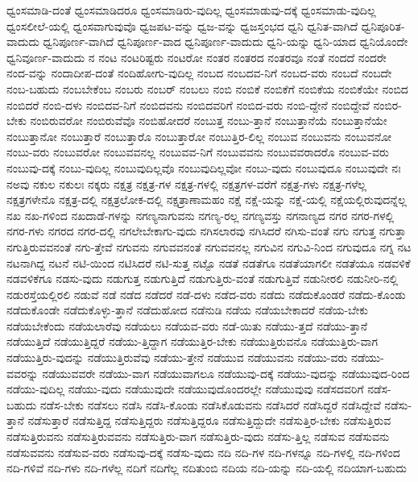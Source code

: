 {ಧ್ವಂಸಮಾಡಿ-ದಂತೆ
ಧ್ವಂಸಮಾಡಿದರೂ
ಧ್ವಂಸಮಾಡಿರು-ವುದಿಲ್ಲ
ಧ್ವಂಸಮಾಡುವು-ದಕ್ಕೆ
ಧ್ವಂಸಮಾಡು-ವುದಿಲ್ಲ
ಧ್ವಂಸಲೀಲೆ-ಯಲ್ಲಿ
ಧ್ವಂಸವಾಗುವುವೊ
ಧ್ವಜಪಟ-ವನ್ನು
ಧ್ವಜ-ವನ್ನು
ಧ್ವಜಸ್ತಂಭದ
ಧ್ವನಿ
ಧ್ವನಿತ-ವಾಗಿದೆ
ಧ್ವನಿಪೂರಿತ-ವಾದುದು
ಧ್ವನಿಪೂರ್ಣ-ವಾಗಿದೆ
ಧ್ವನಿಪೂರ್ಣ-ವಾದ
ಧ್ವನಿಪೂರ್ಣ-ವಾದುದು
ಧ್ವನಿ-ಯನ್ನು
ಧ್ವನಿ-ಯಾದ
ಧ್ವನಿಯೊಂದೇ
ಧ್ವನಿವೂರ್ಣ-ವಾದುದು
ನ
ನಂಟ
ನಂಟರಿಷ್ಟರು
ನಂಟರೋ
ನಂತರ
ನಂತರದ
ನಂತರವೂ
ನಂತೆ
ನಂದದೆ
ನಂದರೇ
ನಂದ-ವನ್ನು
ನಂದಾದೀಪ-ದಂತೆ
ನಂದಿಹೋಗು-ವುದಿಲ್ಲ
ನಂಬದ
ನಂಬದವ-ನಿಗೆ
ನಂಬದ-ವರು
ನಂಬದೆ
ನಂಬದೇ
ನಂಬ-ಬಹುದು
ನಂಬಬೇಕೆಂಬ
ನಂಬರು
ನಂಬರ್
ನಂಬಲು
ನಂಬಿ
ನಂಬಿಕೆ
ನಂಬಿಕೆಗೆ
ನಂಬಿಕೆಯ
ನಂಬಿಕೆಯೇ
ನಂಬಿದ
ನಂಬಿದರೆ
ನಂಬಿ-ದಳು
ನಂಬಿದವ-ನಿಗೆ
ನಂಬಿದವನು
ನಂಬಿದವರಿಗೆ
ನಂಬಿದ-ವರು
ನಂಬಿ-ದ್ದೇನೆ
ನಂಬಿದ್ದೇವೆ
ನಂಬಿರ-ಬೇಕು
ನಂಬಿರುವರೋ
ನಂಬಿರುವೆವೊ
ನಂಬಿಹೋದರೆ
ನಂಬುತ್ತ
ನಂಬು-ತ್ತಾನೆ
ನಂಬುತ್ತಾನೆಯೆ
ನಂಬುತ್ತಾನೆಯೇ
ನಂಬುತ್ತಾನೋ
ನಂಬುತ್ತಾರೆ
ನಂಬುತ್ತಾರೊ
ನಂಬುತ್ತಾರೋ
ನಂಬುತ್ತಿರ-ಲಿಲ್ಲ
ನಂಬುವ
ನಂಬುವನು
ನಂಬುವನೋ
ನಂಬು-ವರು
ನಂಬುವರೋ
ನಂಬುವವನಲ್ಲ
ನಂಬುವವ-ನಿಗೆ
ನಂಬುವವನು
ನಂಬುವವರಾದರೊ
ನಂಬುವ-ವರು
ನಂಬುವು-ದಕ್ಕೆ
ನಂಬು-ವುದಿಲ್ಲ
ನಂಬುವುದಿಲ್ಲವೊ
ನಂಬುವುದಿಲ್ಲವೋ
ನಂಬು-ವುದು
ನಂಬುವುದೂ
ನಂಬುವುದೇ
ನಃ
ನಅವು
ನಕುಲ
ನಕುಲಃ
ನಕ್ಕರು
ನಕ್ಷತ್ರ
ನಕ್ಷತ್ರ-ಗಳ
ನಕ್ಷತ್ರ-ಗಳಲ್ಲಿ
ನಕ್ಷತ್ರಗಳ-ವರೆಗೆ
ನಕ್ಷತ್ರ-ಗಳು
ನಕ್ಷತ್ರ-ಗಳೆಲ್ಲ
ನಕ್ಷತ್ರಗಳೇನೊ
ನಕ್ಷತ್ರ-ದಲ್ಲಿ
ನಕ್ಷತ್ರಲೋಕ-ದಲ್ಲಿ
ನಕ್ಷತ್ರಾಣಾಮಹಂ
ನಕ್ಷೆ
ನಕ್ಷೆ-ಯನ್ನು
ನಕ್ಷೆ-ಯಲ್ಲಿ
ನಕ್ಷೆಯಲ್ಲಿರುವುದನ್ನೆಲ್ಲ
ನಖ
ನಖ-ಗಳಿಂದ
ನಖದಾಡೆ-ಗಳನ್ನು
ನಗಣ್ಯನಾಗುವನು
ನಗಣ್ಯ-ರಲ್ಲ
ನಗಣ್ಯವಸ್ತು
ನಗನಾಣ್ಯದ
ನಗರ
ನಗರ-ಗಳಲ್ಲಿ
ನಗರ-ಗಳು
ನಗರದ
ನಗರ-ದಲ್ಲಿ
ನಗಲೇಬೇಕಾಗು-ವುದು
ನಗಿಸಲಾರವು
ನಗಿಸಿದರೆ
ನಗಿಸು-ವಂತೆ
ನಗು
ನಗುತ್ತ
ನಗುತ್ತಾ
ನಗುತ್ತಿರುವವನಂತೆ
ನಗು-ತ್ತೇವೆ
ನಗುವನು
ನಗುವವನಂತೆ
ನಗುವವನಲ್ಲ
ನಗುವಿನ
ನಗುವಿ-ನಿಂದ
ನಗುವುದೂ
ನಗ್ನ
ನಟ
ನಟನಾಗಿದ್ದ
ನಟನೆ
ನಟಿ-ಯಿಂದ
ನಟಿಸಿದರೆ
ನಟಿ-ಸುತ್ತ
ನಟ್ಟೊ
ನಡತೆ
ನಡತೆಗೂ
ನಡತೆಯಾಗಲೀ
ನಡತೆಯೂ
ನಡವಳಿಕೆ
ನಡವಳಿಕೆಗೂ
ನಡಸು-ವುದು
ನಡುಗುತ್ತ
ನಡುಗುತ್ತಿದೆ
ನಡುಗುತ್ತಿರು-ವಂತೆ
ನಡುಗುತ್ತಿವೆ
ನಡುನೀರಲಿ
ನಡುನೀರಿ-ನಲ್ಲಿ
ನಡುರಸ್ತೆಯಲ್ಲಿರಲಿ
ನಡುವೆ
ನಡೆ
ನಡೆದ
ನಡೆದರೆ
ನಡೆ-ದಳು
ನಡೆದ-ವರು
ನಡೆದು
ನಡೆದುಕೊಂಡರೆ
ನಡೆದು-ಕೊಂಡು
ನಡೆದುಕೊಂಡೇ
ನಡೆದುಕೊಳ್ಳು-ತ್ತಾನೆ
ನಡೆದುಹೋದ
ನಡೆನುಡಿ
ನಡೆಯ
ನಡೆಯಬೇಕಾದರೆ
ನಡೆಯ-ಬೇಕು
ನಡೆಯಬೇಕೆಂದು
ನಡೆಯಲಾರೆವು
ನಡೆಯಲು
ನಡೆಯವ-ವರು
ನಡೆ-ಯಿತು
ನಡೆಯು-ತ್ತದೆ
ನಡೆಯು-ತ್ತಾನೆ
ನಡೆಯುತ್ತಿದೆ
ನಡೆಯುತ್ತಿದ್ದರೆ
ನಡೆಯು-ತ್ತಿದ್ದಾಗ
ನಡೆಯುತ್ತಿರ-ಬೇಕು
ನಡೆಯುತ್ತಿರುವನೊ
ನಡೆಯುತ್ತಿರು-ವಾಗ
ನಡೆಯುತ್ತಿರು-ವುದನ್ನು
ನಡೆಯುತ್ತಿರುವೆವು
ನಡೆಯು-ತ್ತೇನೆ
ನಡೆಯುವ
ನಡೆಯುವನು
ನಡೆಯು-ವರು
ನಡೆಯು-ವವರನ್ನು
ನಡೆಯುವವರೇ
ನಡೆಯು-ವಾಗ
ನಡೆಯುವಾಗಲೂ
ನಡೆಯುವು-ದಕ್ಕೆ
ನಡೆಯು-ವುದನ್ನು
ನಡೆಯುವುದ-ರಿಂದ
ನಡೆಯು-ವುದಿಲ್ಲ
ನಡೆಯು-ವುದು
ನಡೆಯುವುದೇ
ನಡೆಯುವುದೊಂದರಲ್ಲೇ
ನಡೆಯುವುವು
ನಡೆಸದವರಿಗೆ
ನಡೆಸ-ಬಹುದು
ನಡೆಸ-ಬೇಕು
ನಡೆಸಲು
ನಡೆಸಿ
ನಡೆಸಿ-ಕೊಂಡು
ನಡೆಸಿಕೊಡುವನು
ನಡೆಸಿದರೆ
ನಡೆಸಿದ್ದರೆ
ನಡೆಸಿದ್ದೇವೆ
ನಡೆಸು-ತ್ತಾನೆ
ನಡೆಸುತ್ತಾರೆ
ನಡೆಸುತ್ತಿದ್ದ
ನಡೆಸುತ್ತಿದ್ದರು
ನಡೆಸುತ್ತಿದ್ದರೂ
ನಡೆಸುತ್ತಿದ್ದುದೇ
ನಡೆಸುತ್ತಿರ-ಬೇಕು
ನಡೆಸುತ್ತಿರುವ
ನಡೆಸುತ್ತಿರುವನು
ನಡೆಸುತ್ತಿರುವವನು
ನಡೆಸುತ್ತಿರು-ವಾಗ
ನಡೆಸುತ್ತಿರು-ವುದು
ನಡೆಸು-ತ್ತಿಲ್ಲ
ನಡೆಸುವ
ನಡೆಸುವನು
ನಡೆಸುವವನು
ನಡೆಸುವ-ವರು
ನಡೆಸುವು-ದಕ್ಕೆ
ನಡೆಸು-ವುದು
ನದಿ
ನದಿ-ಗಳ
ನದಿ-ಗಳನ್ನೂ
ನದಿ-ಗಳಲ್ಲಿ
ನದಿ-ಗಳಿಂದ
ನದಿ-ಗಳಿವೆ
ನದಿ-ಗಳು
ನದಿ-ಗಳೆಲ್ಲ
ನದಿಗೆ
ನದಿಗೆಲ್ಲ
ನದಿತುಂಬಿ
ನದಿಯ
ನದಿ-ಯನ್ನು
ನದಿ-ಯಲ್ಲಿ
ನದಿಯಾಗ-ಬಹುದು
}
